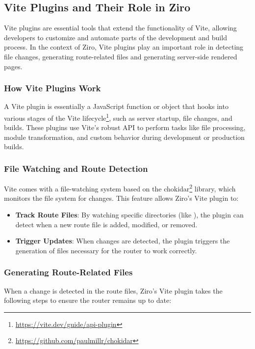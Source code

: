 \subsection{Vite Plugins and Their Role in Ziro}

Vite plugins are essential tools that extend the functionality of Vite, allowing developers to customize and automate parts of the development and build process. In the context of Ziro, Vite plugins play an important role in detecting file changes, generating route-related files and generating server-side rendered pages.

\subsubsection{How Vite Plugins Work}
A Vite plugin is essentially a JavaScript function or object that hooks into various stages of the Vite lifecycle\footnote{\url{https://vite.dev/guide/api-plugin}}, such as server startup, file changes, and builds. These plugins use Vite's robust API to perform tasks like file processing, module transformation, and custom behavior during development or production builds.

\subsubsection{File Watching and Route Detection}
Vite comes with a file-watching system based on the chokidar\footnote{\url{https://github.com/paulmillr/chokidar}} library, which monitors the file system for changes. This feature allows Ziro’s Vite plugin to:
\begin{itemize}
	\item \textbf{Track Route Files}: By watching specific directories (like ), the plugin can detect when a new route file is added, modified, or removed.
	\item \textbf{Trigger Updates}: When changes are detected, the plugin triggers the generation of files necessary for the router to work correctly.
\end{itemize}

\subsubsection{Generating Route-Related Files}
When a change is detected in the route files, Ziro’s Vite plugin takes the following steps to ensure the router remains up to date:

